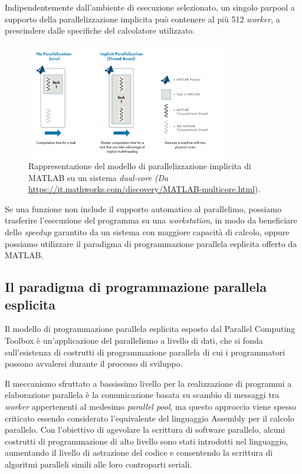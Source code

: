 Indipendentemente dall'ambiente di esecuzione selezionato, un singolo parpool a supporto della parallelizzazione implicita pu\`o contenere al pi\`u 512 \textit{worker}, a prescindere dalle specifiche
del calcolatore utilizzato.
\begin{figure}[htbp]
    \centering
    \includegraphics[width=0.8\textwidth]{../Risorse/Capitolo 2/ImplicitParallelization.png}
    \caption{Rappresentazione del modello di parallelizzazione implicita di MATLAB su un sistema \textit{dual-core}
        \small{\textit{(Da} \url{https://it.mathworks.com/discovery/MATLAB-multicore.html})}.}
    \label{fig:ParallelismoImplicito}
\end{figure}\newline
Se una funzione non include il supporto automatico al parallelimo, possiamo trasferire l'esecuzione del programma su una \textit{workstation}, in modo da beneficiare
dello \textit{speedup} garantito da un sistema con maggiore capacit\`a di calcolo, oppure possiamo utilizzare il paradigma di programmazione parallela esplicita offerto
da MATLAB.

\subsection{Il paradigma di programmazione parallela esplicita}

Il modello di programmazione parallela esplicita esposto dal Parallel Computing Toolbox \`e un'applicazione del parallelismo a livello di dati, che si fonda sull'esistenza di costrutti di programmazione
parallela di cui i programmatori possono avvalersi durante il processo di sviluppo.

Il meccanismo sfruttato a bassissimo livello per la realizzazione di programmi a elaborazione parallela \`e la comunicazione basata su scambio di messaggi tra \textit{worker}
appertenenti al medesimo \textit{parallel pool}, ma questo approccio viene spesso criticato essendo considerato l'equivalente del linguaggio
Assembly per il calcolo parallelo.\newline
Con l'obiettivo di agevolare la scrittura di software parallelo, alcuni costrutti di programmazione di alto livello sono stati introdotti nel linguaggio, aumentando il livello di
astrazione del codice e consentendo la scrittura di algoritmi paralleli simili alle loro controparti seriali.


